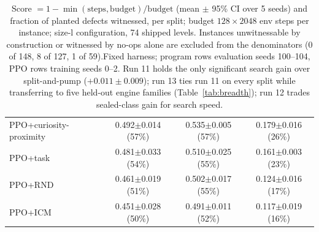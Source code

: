 \begin{table}[t]
\begin{tabular}{lccc}
PPO+curiosity-proximity & 0.492$\pm$0.014 (57\%) & 0.535$\pm$0.005 (57\%) & 0.179$\pm$0.016 (26\%) \\
PPO+task & 0.481$\pm$0.033 (54\%) & 0.510$\pm$0.025 (55\%) & 0.161$\pm$0.003 (23\%) \\
PPO+RND & 0.461$\pm$0.019 (51\%) & 0.502$\pm$0.017 (55\%) & 0.124$\pm$0.016 (17\%) \\
PPO+ICM & 0.451$\pm$0.028 (50\%) & 0.491$\pm$0.011 (52\%) & 0.117$\pm$0.019 (16\%) \\
\bottomrule
\end{tabular}
\caption{Score $=1-\min(\text{steps},\text{budget})/\text{budget}$ (mean $\pm$ 95\% CI over 5 seeds) and fraction of planted defects witnessed, per split; budget $128\times2048$ env steps per instance; size-l configuration, 74 shipped levels. Instances unwitnessable by construction or witnessed by no-ops alone are excluded from the denominators (0 of 148, 8 of 127, 1 of 59).Fixed harness; program rows evaluation seeds 100--104, PPO rows training seeds 0--2. Run 11 holds the only significant search gain over split-and-pump ($+0.011\pm0.009$); run 13 ties run 11 on every split while transferring to five held-out engine families (Table~\ref{tab:breadth}); run 12 trades sealed-class gain for search speed.}
\label{tab:transfer_fixed}
\end{table}